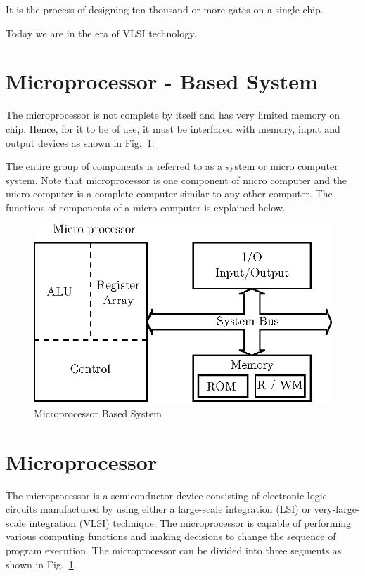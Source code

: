 It is the process of designing ten thousand or more gates on a single chip.

Today we are in the era of VLSI technology.

\section{Microprocessor - Based System}\label{sec7.3}

The microprocessor is not complete by itself and has very limited memory on chip. Hence, for it to be of use, it must be interfaced with memory, input and output devices as shown in Fig.~\ref{fig7.2}.

The entire group of components is referred to as a system or micro computer system. Note that microprocessor is one component of micro computer and the micro computer is a complete computer similar to any other computer. The functions of components of a micro computer is explained below.
\begin{figure}[H]
\centering
\includegraphics[scale=.92]{chap7/fig7.2.eps}
\caption{Microprocessor Based System}\label{fig7.2}
\end{figure}

\section{Microprocessor}\label{sec7.4}

The microprocessor is a semiconductor device consisting of electronic logic circuits manufactured by using either a large-scale integration (LSI) or very-large-scale integration (VLSI) technique. The microprocessor is capable of performing various computing functions and making decisions to change the sequence of program execution. The microprocessor can be divided into three segments as shown in Fig.~\ref{fig7.2}.\\[-20pt]

